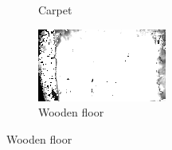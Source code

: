 \begin{figure}[h!tb]
\begin{subfigure}[b]{0.25\textwidth}
        \caption{Carpet}
        \label{fig:material-carpet}
    \end{subfigure}%
    \begin{subfigure}[b]{0.25\textwidth}
        \centering
        \includegraphics[width=0.9\linewidth]{images/materials/wood-conf}
        \caption{Wooden floor}
        \label{fig:material-wood}
    \end{subfigure}%

    \vspace{0.5em}


\end{figure}
